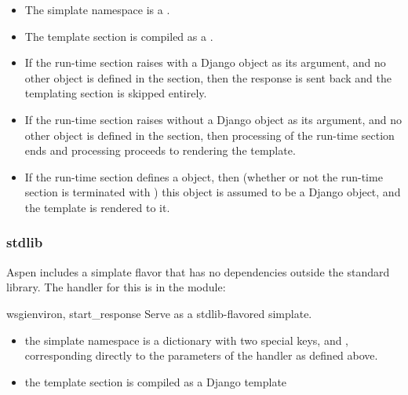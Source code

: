 \begin{itemize}

\item{The simplate namespace is a .}

\item{The template section is compiled as a .}

\item{If the run-time section raises  with a Django
 object as its argument, and no other  object
is defined in the section, then the  response is sent back and
the templating section is skipped entirely.}

\item{If the run-time section raises  without a Django
 object as its argument, and no other  object
is defined in the section, then processing of the run-time section ends and
processing proceeds to rendering the template.}

\item{If the run-time section defines a  object, then (whether or
not the run-time section is terminated with ) this object is
assumed to be a Django  object, and the template is rendered
to it.}

\end{itemize}


\subsubsection{stdlib}
\label{api-handlers-simplates-stdlib}

Aspen includes a simplate flavor that has no dependencies outside the standard
library. The handler for this is in the 
module:

\begin{funcdesc}{wsgi}{environ, start_response} Serve
 as a stdlib-flavored simplate.\end{funcdesc}

\begin{itemize}
\item{the simplate namespace is a dictionary with two special keys,
 and , corresponding directly to the parameters
of the handler as defined above.}
\item{the template section is compiled as a Django template}
\end{itemize}





